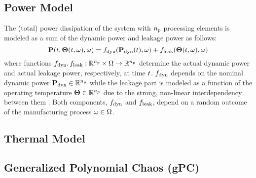 \subsection{Power Model} 
The (total) power dissipation of the system with ${n_p}$ processing elements is modeled as a sum of the dynamic power and leakage power as follows:
\begin{equation} \elabel{power-model}
  \vP(\t, \vTO(\t, \o), \o) = f_\dyn(\vP_\dyn(\t), \o) + f_\leak(\vTO(\t, \o), \o)
\end{equation}
where functions $f_{\text{dyn}}, f_{\text{leak}}: \mathbb{R}^{n_p} \times \Omega \to \mathbb{R}^{n_p}$ determine the actual dynamic power and actual leakage power, respectively, at time $t$. $f_{\text{dyn}}$ depends on the nominal dynamic power $\mathbf{P}_{\text{dyn}} \in \mathbb{R}^{n_p}$ while the leakage part is modeled as a function of the operating temperature ${\boldsymbol\Theta} \in \mathbb{R}^{n_p}$ due to the strong, non-linear interdependency between them \cite{srivastava2010, liu2007}. Both components, $f_{\text{dyn}}$ and $f_{\text{leak}}$, depend on a random outcome of the manufacturing process $\omega \in \Omega$.

\subsection{Thermal Model} 


\subsection{Generalized Polynomial Chaos (gPC)}

